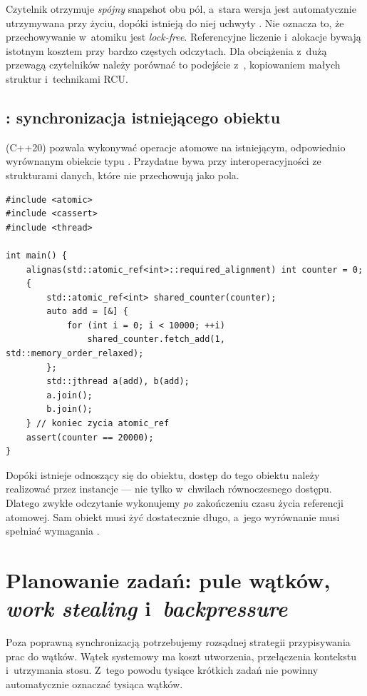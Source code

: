 Czytelnik otrzymuje \emph{spójny} snapshot obu pól, a~stara wersja
jest automatycznie utrzymywana przy życiu, dopóki istnieją do niej
uchwyty . Nie oznacza to, że przechowywanie
 w~atomiku jest \emph{lock-free}. Referencyjne
liczenie i~alokacje bywają istotnym kosztem przy bardzo częstych
odczytach. Dla obciążenia z~dużą przewagą czytelników należy
porównać to podejście z~, kopiowaniem małych
struktur i~technikami RCU.

\subsection{: synchronizacja istniejącego obiektu}

 (C++20) pozwala wykonywać operacje atomowe
na istniejącym, odpowiednio wyrównanym obiekcie typu .
Przydatne bywa przy interoperacyjności ze strukturami danych,
które nie przechowują  jako pola.

\begin{lstlisting}[caption={Operacje atomowe na istniejącej zmiennej (C++20).}]
#include <atomic>
#include <cassert>
#include <thread>

int main() {
    alignas(std::atomic_ref<int>::required_alignment) int counter = 0;
    {
        std::atomic_ref<int> shared_counter(counter);
        auto add = [&] {
            for (int i = 0; i < 10000; ++i)
                shared_counter.fetch_add(1, std::memory_order_relaxed);
        };
        std::jthread a(add), b(add);
        a.join();
        b.join();
    } // koniec zycia atomic_ref
    assert(counter == 20000);
}
\end{lstlisting}

Dopóki istnieje  odnoszący się do obiektu, dostęp
do tego obiektu należy realizować przez instancje 
--- nie tylko w~chwilach równoczesnego dostępu. Dlatego zwykłe
odczytanie  wykonujemy \emph{po} zakończeniu czasu
życia referencji atomowej. Sam obiekt musi żyć dostatecznie długo,
a~jego wyrównanie musi spełniać wymagania .

\section{Planowanie zadań: pule wątków, \emph{work stealing} i~\emph{backpressure}}
\label{sec:cpp16-scheduling}

Poza poprawną synchronizacją potrzebujemy rozsądnej strategii
przypisywania prac do wątków. Wątek systemowy ma koszt utworzenia,
przełączenia kontekstu i~utrzymania stosu. Z~tego powodu tysiące
krótkich zadań nie powinny automatycznie oznaczać tysiąca wątków.

